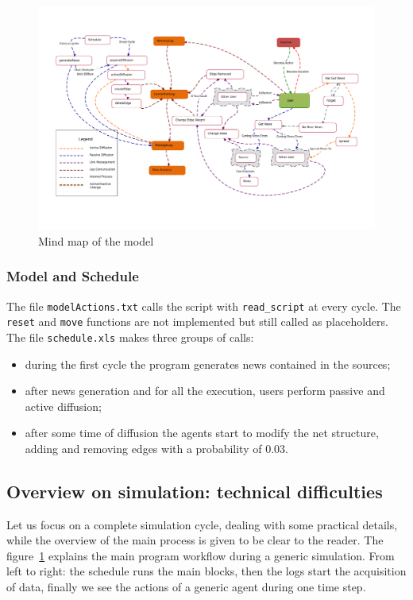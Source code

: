 \begin{figure}[htpb]
  \centering
  \includegraphics[trim={1.9cm 3cm 1.5cm 2cm}, clip,width=\columnwidth]{img/pdf/mindMap.pdf}
  \caption{Mind map of the model}
  \label{fig:mindmap}
\end{figure}

\subsubsection{Model and Schedule}\label{subsubsec:schedule}
The file \texttt{modelActions.txt} calls the script with
\texttt{read\_script} at every cycle.
The \texttt{reset} and \texttt{move} functions are not implemented
but still called as placeholders.
The file \texttt{schedule.xls} makes three groups of calls:
\begin{itemize}
\item [timestep 1] during the first cycle the program generates news
  contained in the sources;
\item [timesteps 2 - 10000] after news generation and for all
  the execution, users perform passive and active diffusion;
\item [timesteps 10 - 10000] after some time of diffusion the agents start
  to modify the net structure, adding and removing edges with a probability
  of 0.03.
\end{itemize}

\subsection{Overview on simulation: technical difficulties}\label{subsec:overview}
Let us focus on a complete simulation cycle, dealing with some
practical details, while the overview of the main process is given to be
clear to the reader. The figure~\ref{fig:mindmap} explains the main program
workflow during a generic simulation.
From left to right: the schedule runs the main blocks, then the logs start
the acquisition of data, finally we see the actions of a generic agent
during one time step.


